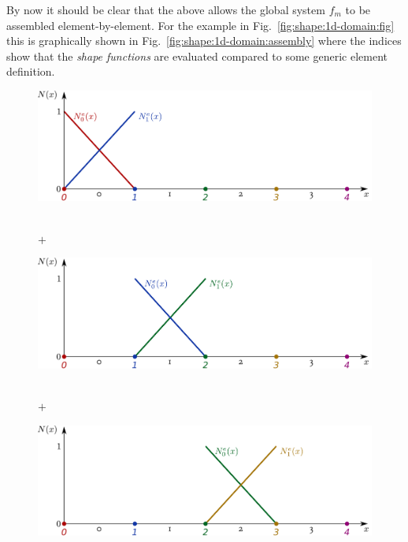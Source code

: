 \documentclass[times,namecite]{goose-article}
\begin{document}
By now it should be clear that the above allows the global system $f_m$ to be assembled element-by-element. For the example in Fig.~\ref{fig:shape:1d-domain:fig} this is graphically shown in Fig.~\ref{fig:shape:1d-domain:assembly} where the indices show that the \emph{shape functions} are evaluated compared to some generic element definition.

\begin{figure}[htp]
  \centering
  \captionsetup[subfigure]{justification=centering}
  \begin{minipage}[t]{.5\textwidth}
    \centering
    \includegraphics[width=1.\textwidth]{figures/shape-functions-1d-element-0.pdf}
  \end{minipage}
  \\
  $+$
  \\
  \begin{minipage}[t]{.5\textwidth}
    \centering
    \includegraphics[width=1.\textwidth]{figures/shape-functions-1d-element-1.pdf}
  \end{minipage}
  \\
  $+$
  \\
  \begin{minipage}[t]{.5\textwidth}
    \centering
    \includegraphics[width=1.\textwidth]{figures/shape-functions-1d-element-2.pdf}

\end{minipage}
\end{figure}
\end{document}

